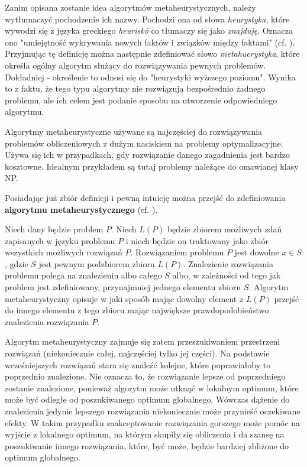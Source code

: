 Zanim opisana zostanie idea algorytmów metaheurystycznych, należy wytłumaczyć pochodzenie ich nazwy. Pochodzi ona od słowa \textit{heurystyka}, które wywodzi się z języka greckiego \textit{heuriskō} co tłumaczy się jako \textit{znajduję}. Oznacza ono "umiejętność wykrywania nowych faktów i związków między faktami" (cf. \cite{SJPHeurystyka}). Przyjmując tę definicję można następnie zdefiniować słowo \textit{metahuerystyka}, które określa ogólny algorytm służący do rozwiązywania pewnych problemów. Dokładniej - określenie to odnosi się do "heurystyki wyższego poziomu". Wynika to z faktu, że tego typu algorytmy nie rozwiązują bezpośrednio żadnego problemu, ale ich celem jest podanie sposobu na utworzenie odpowiedniego algorytmu.

Algorytmy metaheurystyczne używane są najczęściej do rozwiązywania problemów obliczeniowych z dużym naciskiem na problemy optymalizacyjne. Używa się ich w przypadkach, gdy rozwiązanie danego zagadnienia jest bardzo kosztowne. Idealnym przykładem są tutaj problemy należące do omawianej klasy NP.

Posiadając już zbiór definicji i pewną intuicję można przejść do zdefiniowania \textbf{algorytmu metaheurystycznego} (cf. \cite{EssentialsOfMetaheuristics}).

\begin{definition}
Niech dany będzie problem $P$. Niech $L(P)$ będzie zbiorem możliwych zdań zapisanych w języku problemu $P$ i niech będzie on traktowany jako zbiór wszystkich możliwych rozwiązań $P$. Rozwiązaniem problemu $P$ jest dowolne $x \in S$, gdzie $S$ jest pewnym podzbiorem zbioru $L(P)$. Znalezienie rozwiązania problemu polega na znalezieniu albo całego $S$ albo, w zależności od tego jak problem jest zdefiniowany, przynajmniej jednego elementu zbioru $S$. Algorytm metaheurystyczny opisuje w jaki sposób mając dowolny element z $L(P)$ przejść do innego elementu z tego zbioru mając największe prawdopodobieństwo znalezienia rozwiązania $P$.
\end{definition}

Algorytm metaheurystyczny zajmuje się zatem przeszukiwaniem przestrzeni rozwiązań (niekoniecznie całej, najczęściej tylko jej części). Na podstawie wcześniejszych rozwiązań stara się znaleźć kolejne, które poprawiałoby to poprzednio znalezione. Nie oznacza to, że rozwiązanie lepsze od poprzedniego zostanie znalezione, ponieważ algorytm może utknąć w lokalnym optimum, które może być odległe od poszukiwanego optimum globalnego. Wówczas dążenie do znalezienia jedynie lepszego rozwiązania niekoniecznie może przynieść oczekiwane efekty. W takim przypadku zaakceptowanie rozwiązania gorszego może pomóc na wyjście z lokalnego optimum, na którym skupiły się obliczenia i da szansę na poszukiwanie innego rozwiązania, które, być może, będzie bardziej zbliżone do optimum globalnego.

